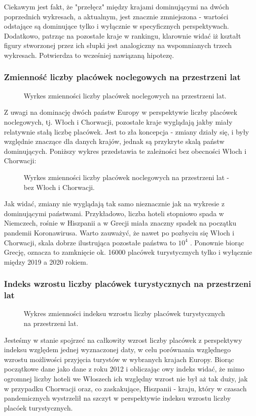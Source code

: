 \documentclass[12pt]{article}
\begin{document}
Ciekawym jest fakt, że "przełęcz" między krajami dominującymi na dwóch poprzednich wykresach, a aktualnym, jest znacznie 
zmniejszona - wartości odstające są dominujące tylko i wyłącznie w specyficznych perspektywach. 
Dodatkowo, patrząc na pozostałe kraje w rankingu, klarownie widać iż kształt figury stworzonej przez ich słupki jest
analogiczny na wspomnianych trzech wykresach. Potwierdza to wcześniej nawiązaną hipotezę. 


\subsubsection{Zmienność liczby placówek noclegowych na przestrzeni lat}
\begin{figure}[H]
    
    \caption{Wyrkes zmienności liczby placówek noclegowych na przestrzeni lat.}
\end{figure}
Z uwagi na dominację dwóch państw Europy w perspektywie liczby placówek noclegowych, tj. Włoch i Chorwacji, 
pozostałe kraje wyglądają jakby miały relatywnie stałą liczbę placówek. Jest to zła koncepcja - zmiany działy się, 
i były względnie znaczące dla danych krajów, jednak są przykryte skalą państw dominujących. Poniższy wykres przedstawia 
te zależności bez obecności Włoch i Chorwacji:
\begin{figure}[H]
    
    \caption{Wyrkes zmienności liczby placówek noclegowych na przestrzeni lat - bez Włoch i Chorwacji.}
\end{figure}
Jak widać, zmiany nie wyglądają tak samo nieznacznie jak na wykresie z dominującymi państwami. Przykładowo, 
liczba hoteli stopniowo spada w Niemczech, rośnie w Hiszpanii a w Grecji miała znaczny spadek na początku pandemii Koronawirusa.
Warto zauważyć, że nawet po pozbyciu się Włoch i Chorwacji, skala dobrze ilustrująca pozostałe państwa to $ 10^4 $ . 
Ponownie biorąc Grecję, oznacza to zamknięcie ok. 16000 placówek turystycznych tylko i wyłącznie między 2019 a 2020 rokiem. 

\subsubsection{Indeks wzrostu liczby placówek turystycznych na przestrzeni lat}
\begin{figure}[H]
    
    \caption{Wykres zmienności indeksu wzrostu liczby placówek turystycznych na przestrzeni lat.}
\end{figure}
Jesteśmy w stanie spojrzeć na całkowity wzrost liczby placówek z perspektywy indeksu względem jednej wyznaczonej daty, 
w celu porównania względnego wzrostu możliwości przyjęcia turystów w wybranych krajach Europy. Biorąc początkowe dane jako 
dane z roku 2012 i obliczając owy indeks widać, że mimo ogromnej liczby hoteli we Włoszech ich względny wzrost nie był aż tak duży, jak w przypadku Chorwacji oraz, 
co zaskakujące, Hiszpanii - kraju, który w czasach pandemicznych wystrzelił na szczyt w perspektywie indeksu wzrostu liczby placóek turystycznych. 
\end{document}
